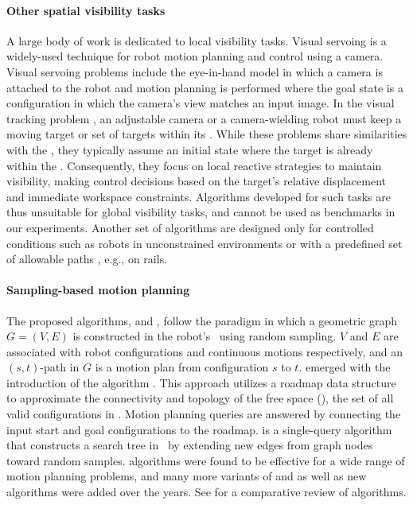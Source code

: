 \paragraph*{Other spatial visibility tasks}
A large body of work is dedicated to local visibility tasks. Visual servoing \cite{ch-vsvt-08} is a widely-used technique for robot motion planning and control using a camera. Visual servoing problems include the eye-in-hand model in which a camera is attached to the robot and motion planning is performed where the goal state is a configuration in which the camera's view matches an input image. In the visual tracking problem \cite{bah-mp3dttao-07,ghnd-kmmtfvmc-11,lwlcz-udmavtcrehfcc-15,daop-mvdoceummvfi-23}, an adjustable camera or a camera-wielding robot must keep a moving target or set of targets within its \fov. While these problems share similarities with the \tvmp, they typically assume an initial state where the target is already within the \fov. Consequently, they focus on local reactive strategies to maintain visibility, making control decisions based on the target’s relative displacement and immediate workspace constraints. Algorithms developed for such tasks are thus unsuitable for global visibility tasks, and cannot be used as benchmarks in our experiments. Another set of \vistamp algorithms are designed only for controlled conditions such as robots in unconstrained environments or with a predefined set of allowable paths \cite{w-vbopmp-17}, e.g., on rails.

\paragraph*{Sampling-based motion planning}
The proposed algorithms, \visrrt and \visprm, follow the \sbmp paradigm in which a geometric graph $G=(V,E)$ is constructed in the robot's \cspace ~using random sampling. $V$ and $E$ are associated with robot configurations and continuous motions respectively, and an $(s,t)$-path in $G$ is a motion plan from configuration $s$ to $t$. \sbmp emerged with the introduction of the \prm algorithm \cite{kslo-prpp-96}. This approach utilizes a roadmap data structure to approximate the connectivity and topology of the free space (\cfree), the set of all valid configurations in \cspace. Motion planning queries are answered by connecting the input start and goal configurations to the roadmap. \rrt \cite{l-rrtnt-98,kl-rrtceasqpp-00} is a single-query algorithm that constructs a search tree in \cspace ~by extending new edges from graph nodes toward random samples.  \sbmp algorithms were found to be effective for a wide range of motion planning problems, and many more variants of \rrt and \prm as well as new \sbmp algorithms were added over the years. See \cite{ock-smpcr-24} for a comparative review of \sbmp algorithms. 
